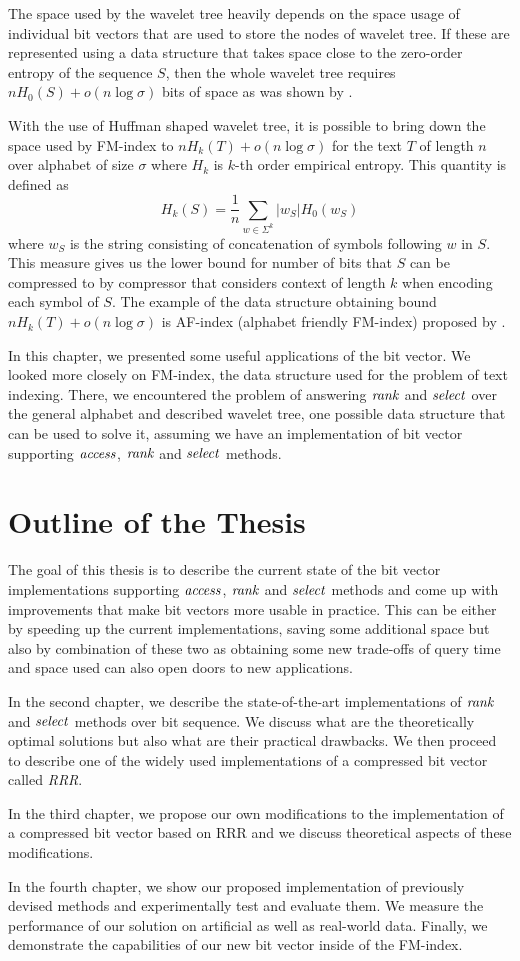 The space used by the wavelet tree heavily depends on the space usage of individual bit vectors
that are used to store the nodes of wavelet tree. If these are represented using a data structure
that takes space close to the zero-order entropy of the sequence $S$, then the whole wavelet tree
requires $nH_0(S) + o(n\log\sigma)$ bits of space as was shown by \cite{grossi2003high}.

With the use of Huffman shaped wavelet tree, it is possible to bring down the space used by FM-index to
$nH_k(T)+o(n\log \sigma)$ for the text $T$ of length $n$ over alphabet of size $\sigma$ where $H_k$ is
$k$-th order empirical entropy. This quantity is defined as
$$H_k(S) = \frac{1}{n} \sum_{w\in \Sigma^k} |w_S| H_0(w_S)$$ where $w_S$ is the string consisting of
concatenation of symbols following $w$ in $S$. This measure gives us the lower bound for number of bits
that $S$ can be compressed to by compressor that considers context of length $k$ when encoding each
symbol of $S$. The example of the data structure obtaining bound $nH_k(T)+o(n\log \sigma)$ is AF-index
(alphabet friendly FM-index) proposed by \cite{ferragina2004alphabet}.

In this chapter, we presented some useful applications of the bit vector. We looked more closely on
FM-index, the data structure used for the problem of text indexing. There, we encountered the
problem of answering $\mathit{rank}$ and $\mathit{select}$ over the general alphabet and described wavelet tree,
one possible data structure that can be used to solve it, assuming we have an implementation of
bit vector supporting $\mathit{access}$, $\mathit{rank}$ and $\mathit{select}$ methods.

\section{Outline of the Thesis}

The goal of this thesis is to describe the current state of the bit vector implementations
supporting $\mathit{access}$, $\mathit{rank}$ and $\mathit{select}$ methods and come up with improvements that
make bit vectors more usable in practice. This can be either by speeding up the current
implementations, saving some additional space but also by combination of these two as
obtaining some new trade-offs of query time and space used can also open doors to new
applications.

In the second chapter, we describe the state-of-the-art implementations of $\mathit{rank}$ and
$\mathit{select}$ methods over bit sequence. We discuss what are the theoretically optimal
solutions but also what are their practical drawbacks. We then proceed to describe one
of the widely used implementations of a compressed bit vector called \textit{RRR}.

In the third chapter, we propose our own modifications to the implementation of
a compressed bit vector based on RRR and we discuss theoretical aspects of these
modifications.

In the fourth chapter, we show our proposed implementation of previously devised
methods and experimentally test and evaluate them. We measure the performance
of our solution on artificial as well as real-world data. Finally, we demonstrate
the capabilities of our new bit vector inside of the FM-index.